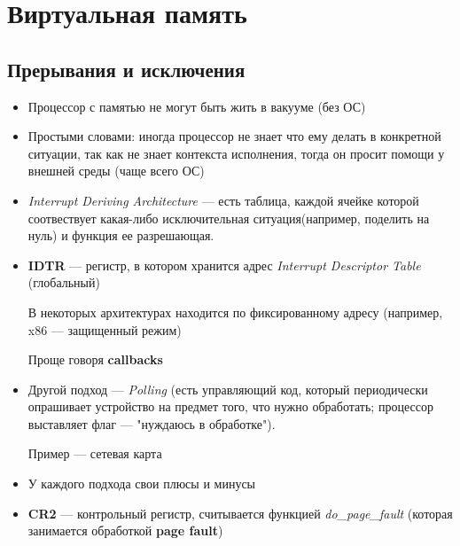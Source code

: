 \documentclass[../../lectures.tex]{subfiles}
\begin{document}
\chapter{Виртуальная память}

\section{Прерывания и исключения}
\begin{itemize}
    \item Процессор с памятью не могут быть жить в вакууме (без ОС)
    \item Простыми словами: иногда процессор не знает что ему делать 
          в конкретной ситуации, так как не знает контекста исполнения, 
          тогда он просит помощи у внешней среды (чаще всего ОС)
    \item \emph{Interrupt Deriving Architecture} --- есть таблица, каждой ячейке 
          которой соотвествует какая-либо исключительная ситуация(например, 
          поделить на нуль) и функция ее разрешающая.
    \item \textbf{IDTR} --- регистр, в котором хранится адрес 
          \emph{Interrupt Descriptor Table} (глобальный)

          В некоторых архитектурах находится по фиксированному адресу 
          (например, x86 --- защищенный режим)

          Проще говоря \textbf{callbacks}

    \item Другой подход --- \emph{Polling} (есть управляющий код, 
          который периодически опрашивает устройство на предмет того,
          что нужно обработать; процессор выставляет флаг --- 
          "нуждаюсь в обработке"). 
          
          Пример --- сетевая карта

    \item У каждого подхода свои плюсы и минусы

    \item \textbf{CR2} --- контрольный регистр, считывается функцией \emph{do\_page\_fault} 
          (которая занимается обработкой \textbf{page fault})
\end{itemize}

\newpage
\end{document}
